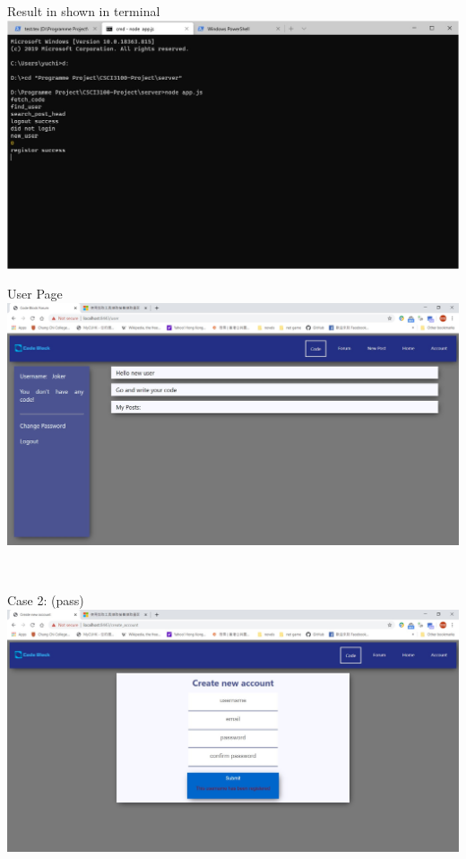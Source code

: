 Result in shown in terminal\\
\includegraphics[scale=0.7]{Doc/Pics/case-5-1-1(2)}

User Page\\
\includegraphics[scale=0.45]{Doc/Pics/case-5-1-1(3)}

~

Case 2: (pass)\\
\includegraphics[scale=0.45]{Doc/Pics/case-5-1-2}

~

